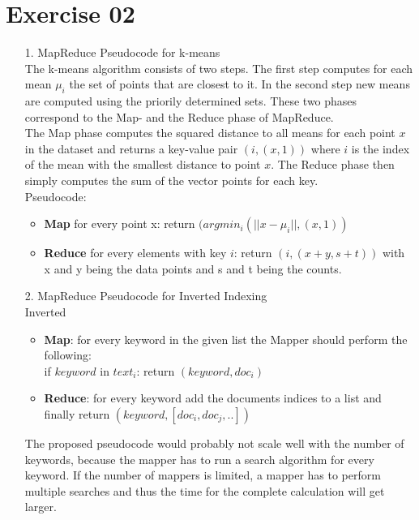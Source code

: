 \documentclass[11pt,a4paper]{scrartcl}
\begin{document}
\section*{Exercise 02}
	\begin{itemize}
		\item[1.] MapReduce Pseudocode for k-means\\
		The k-means algorithm consists of two steps. The first step computes for each mean $\mu_i$ the set of points that are closest to it. In the second step new means are computed using the priorily determined sets. These two phases correspond to the Map- and the Reduce phase of MapReduce. \\
The Map phase computes the squared distance to all means for each point $x$ in the dataset and returns a key-value pair $(i, (x,1))$ where $i$ is the index of the mean with the smallest distance to point $x$. The Reduce phase then simply computes the sum of the vector points for each key. \\
Pseudocode:
\begin{itemize}
	\item \textbf{Map} for every point x: return $(argmin_i(|| x- \mu_i ||, (x,1))$
	\item \textbf{Reduce} for every elements with key $i$: return $(i, (x+y, s+t))$ with x and y being the data points and s and t being the counts.
\end{itemize}

		\item[2.] MapReduce Pseudocode for Inverted Indexing\\
		Inverted 
		\begin{itemize}
			\item \textbf{Map}: for every keyword in the given list the Mapper should perform the following: \\
		if $keyword$ in $text_i$: return $(keyword, doc_i)$
			\item \textbf{Reduce}: for every keyword add the documents indices to a list and finally return $(keyword, [doc_i, doc_j, ..])$
		\end{itemize}
		The proposed pseudocode would probably not scale well with the number of keywords, because the mapper has to run a search algorithm for every keyword. If the number of mappers is limited, a mapper has to perform multiple searches and thus the time for the complete calculation will get larger. 



\end{itemize}
\end{document}
